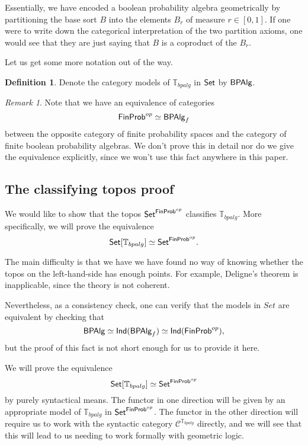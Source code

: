\documentclass[a4paper]{amsproc}
\theoremstyle{plain}
\theoremstyle{definition}
\newtheorem{definition}[theorem]{Definition}
\theoremstyle{remark}
\newtheorem{remark}[theorem]{Remark}
\numberwithin{equation}{section}
\newcommand{\Set}{\textup{\textsf{Set}}}
\newcommand{\FinProb}{\textup{\textsf{FinProb}}}
\newcommand{\BPAlg}{\textup{\textsf{BPAlg}}}
\newcommand{\Ind}{\textsf{Ind}}
\begin{document}
Essentially, we have encoded a boolean probability algebra geometrically by partitioning the base sort $B$ into the elements $B_r$ of measure $r \in [0,1]$. If one were to write down the categorical interpretation of the two partition axioms, one would see that they are just saying that $B$ is a coproduct of the $B_r$.

Let us get some more notation out of the way.

\begin{definition}
Denote the category models of $\mathbb{T}_{bpalg}$ in $\Set$ by $\BPAlg$.
\end{definition}

\begin{remark}
    Note that we have an equivalence of categories
    \[
        \FinProb^{op} \simeq \BPAlg_f
    \]
    between the opposite category of finite probability spaces and the category of finite boolean probability algebras. We don't prove this in detail nor do we give the equivalence explicitly, since we won't use this fact anywhere in this paper.
\end{remark}

\subsection{The classifying topos proof}

We would like to show that the topos $\Set^{\FinProb^{op}}$ classifies $\mathbb{T}_{bpalg}$. More specifically, we will prove the equivalence
\[
\Set[\mathbb{T}_{bpalg}] \simeq \Set^{\FinProb^{op}} .
\]

The main difficulty is that we have we have found no way of knowing whether the topos on the left-hand-side has enough points. For example, Deligne's theorem is inapplicable, since the theory is not coherent.

Nevertheless, as a consistency check, one can verify that the models in $Set$ are equivalent by checking that
\[
    \BPAlg \simeq \Ind(\BPAlg_f) \simeq \Ind(\FinProb^{op}),
\]
but the proof of this fact is not short enough for us to provide it here.

We will prove the equivalence
\[
\Set[\mathbb{T}_{bpalg}] \simeq \Set^{\FinProb^{op}}
\]
by purely syntactical means. The functor in one direction will be given by an appropriate model of $\mathbb{T}_{bpalg}$ in $\Set^{\FinProb^{op}}$. The functor in the other direction will require us to work with the syntactic category $\mathcal{C}^{\mathbb{T}_{bpalg}}$ directly, and we will see that this will lead to us needing to work formally with geometric logic.
\end{document}
